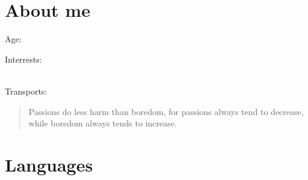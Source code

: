 \begin{CVsidebar}

\section{About me}
Age:  \par
Interrests: \\  \\  \par
Transports: 

\vspace{\baselineskip}
\begin{quote}
    Passions do less harm than boredom, for passions always tend to decrease, while boredom always tends to increase.
\end{quote}

\section{Languages}

%
%
%
%
%
%


\end{CVsidebar}
